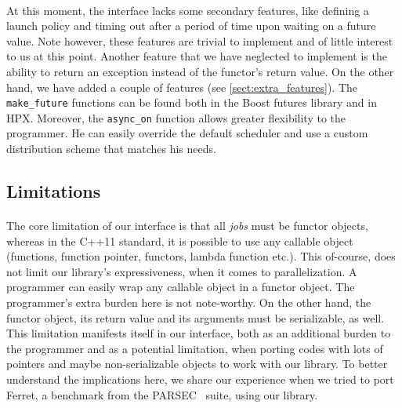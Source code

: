 \paragraph{}
At this moment, the interface lacks some secondary features, like defining a launch policy and timing out
after a period of time upon waiting on a future value.  Note however, these features are trivial to implement
and of little interest to us at this point.  Another feature that we have neglected to implement is the 
ability to return an exception instead of the functor's return value.  On the other hand, we have added a couple
of features (see \ref{sect:extra_features}).  The \texttt{make\_future} functions can be found both in the Boost futures
library and in HPX.  Moreover, the \texttt{async\_on} function allows greater flexibility to the programmer.  He can 
easily override the default scheduler and use a custom distribution scheme that matches his needs.  

\subsection{Limitations}
\label{sect:interface_limitations}
\paragraph{}
The core limitation of our interface is that all \emph{jobs} must be functor objects,
whereas in the C++11 standard, it is possible to use any callable object (functions, function pointer, functors,
lambda function etc.).  	This of-course, does not limit our library's expressiveness, when it comes to parallelization.
A programmer can easily wrap any callable object in a functor object.  The programmer's extra burden here is not 
note-worthy.  On the other hand,  the functor object, its return value and its arguments must be serializable, as well.  
This limitation manifests itself in our interface, both as an additional burden to the programmer and as a potential
limitation, when porting codes with lots of pointers and maybe non-serializable objects to work with our library.
To better understand the implications here, we share our experience when we tried to port Ferret, a benchmark from
the PARSEC~\cite{bienia11benchmarking} suite, using our library.

